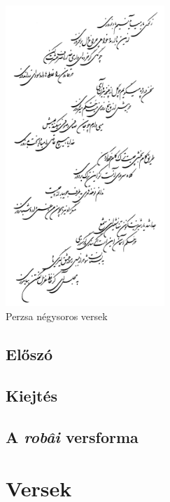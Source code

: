

\frontmatter
{}

\begin{titlepage}
\centering
\includegraphics[width=6cm]{hafez.png}\\
\vspace{\fill}
{\LARGE Perzsa négysoros versek}
\end{titlepage}





\tableofcontents

\chapter*{Előszó}


\chapter*{Kiejtés}


\chapter*{A \emph{robâi} versforma}


\mainmatter
{}
\part*{Versek}



